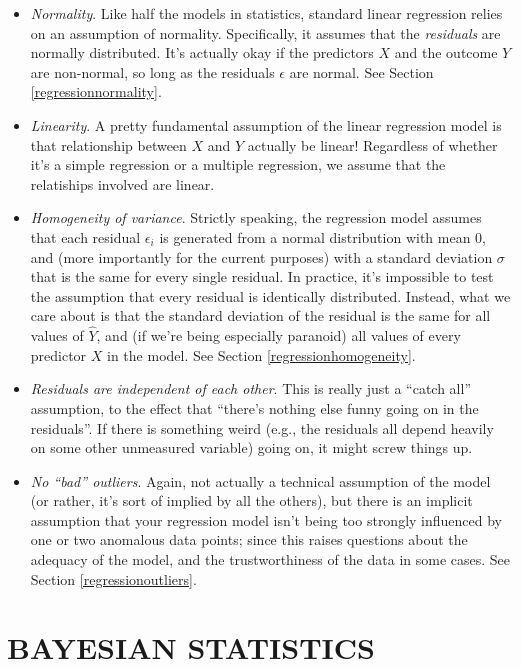 \documentclass[
]{book}
\providecommand{\tightlist}{%
  \setlength{\itemsep}{0pt}\setlength{\parskip}{0pt}}
\theoremstyle{definition}
\theoremstyle{definition}
\theoremstyle{definition}
\theoremstyle{definition}
\theoremstyle{remark}
\begin{document}
\begin{itemize}
\tightlist
\item
  \emph{Normality}. Like half the models in statistics, standard linear regression relies on an assumption of normality. Specifically, it assumes that the \emph{residuals} are normally distributed. It's actually okay if the predictors \(X\) and the outcome \(Y\) are non-normal, so long as the residuals \(\epsilon\) are normal. See Section \ref{regressionnormality}.
\item
  \emph{Linearity}. A pretty fundamental assumption of the linear regression model is that relationship between \(X\) and \(Y\) actually be linear! Regardless of whether it's a simple regression or a multiple regression, we assume that the relatiships involved are linear.
\item
  \emph{Homogeneity of variance}. Strictly speaking, the regression model assumes that each residual \(\epsilon_i\) is generated from a normal distribution with mean 0, and (more importantly for the current purposes) with a standard deviation \(\sigma\) that is the same for every single residual. In practice, it's impossible to test the assumption that every residual is identically distributed. Instead, what we care about is that the standard deviation of the residual is the same for all values of \(\hat{Y}\), and (if we're being especially paranoid) all values of every predictor \(X\) in the model. See Section \ref{regressionhomogeneity}.
\item
  \emph{Residuals are independent of each other}. This is really just a ``catch all'' assumption, to the effect that ``there's nothing else funny going on in the residuals''. If there is something weird (e.g., the residuals all depend heavily on some other unmeasured variable) going on, it might screw things up.
\item
  \emph{No ``bad'' outliers}. Again, not actually a technical assumption of the model (or rather, it's sort of implied by all the others), but there is an implicit assumption that your regression model isn't being too strongly influenced by one or two anomalous data points; since this raises questions about the adequacy of the model, and the trustworthiness of the data in some cases. See Section \ref{regressionoutliers}.
\end{itemize}

\hypertarget{part-bayesian-statistics}{%
\part*{BAYESIAN STATISTICS}\label{part-bayesian-statistics}}
\end{document}
